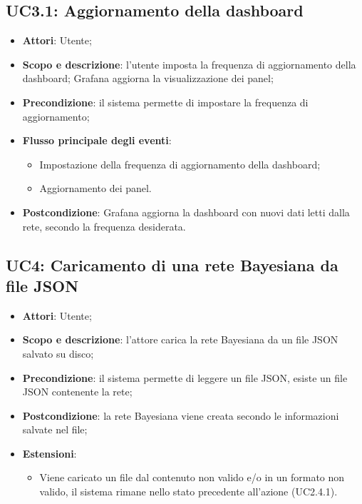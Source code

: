 \subsection{UC3.1: Aggiornamento della dashboard}
\hypertarget{UC3.1}{}
\begin{itemize}
	\item \textbf{Attori}: Utente;
	\item \textbf{Scopo e descrizione}: l'utente imposta la frequenza di aggiornamento della dashboard; Grafana aggiorna la visualizzazione dei panel;
	\item \textbf{Precondizione}: il sistema permette di impostare la frequenza di aggiornamento;
	\item \textbf{Flusso principale degli eventi}:
	\begin{itemize}
		\item Impostazione della frequenza di aggiornamento della dashboard;
		\item Aggiornamento dei panel.
	\end{itemize}
	\item \textbf{Postcondizione}: Grafana aggiorna la dashboard con nuovi dati letti dalla rete, secondo la frequenza desiderata.
\end{itemize}

\subsection{UC4: Caricamento di una rete Bayesiana da file JSON}
\hypertarget{UC4}{}
\begin{itemize}
	\item \textbf{Attori}: Utente;
	\item \textbf{Scopo e descrizione}: l'attore carica la rete Bayesiana da un file JSON salvato su disco;
	\item \textbf{Precondizione}: il sistema permette di leggere un file JSON, esiste un file JSON contenente la rete;
	\item \textbf{Postcondizione}: la rete Bayesiana viene creata secondo le informazioni salvate nel file;
	\item \textbf{Estensioni}:
	\begin{itemize}
		\item Viene caricato un file dal contenuto non valido e/o in un formato non valido, il sistema rimane nello stato precedente all'azione (UC2.4.1).
	\end{itemize}
\end{itemize}